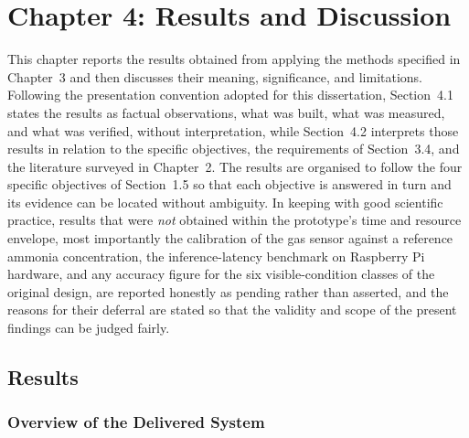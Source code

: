 \documentclass[12pt,a4paper]{report}
\begin{document}
\chapter{Chapter 4: Results and Discussion}
\setcounter{section}{0}
\renewcommand{\thesection}{4.\arabic{section}}
\renewcommand{\thesubsection}{4.\arabic{section}.\arabic{subsection}}

This chapter reports the results obtained from applying the methods specified in Chapter~3 and then discusses their meaning, significance, and limitations. Following the presentation convention adopted for this dissertation, Section~4.1 states the results as factual observations, what was built, what was measured, and what was verified, without interpretation, while Section~4.2 interprets those results in relation to the specific objectives, the requirements of Section~3.4, and the literature surveyed in Chapter~2. The results are organised to follow the four specific objectives of Section~1.5 so that each objective is answered in turn and its evidence can be located without ambiguity. In keeping with good scientific practice, results that were \emph{not} obtained within the prototype's time and resource envelope, most importantly the calibration of the gas sensor against a reference ammonia concentration, the inference-latency benchmark on Raspberry Pi hardware, and any accuracy figure for the six visible-condition classes of the original design, are reported honestly as pending rather than asserted, and the reasons for their deferral are stated so that the validity and scope of the present findings can be judged fairly.

\section{Results}

\subsection{Overview of the Delivered System}
\end{document}
